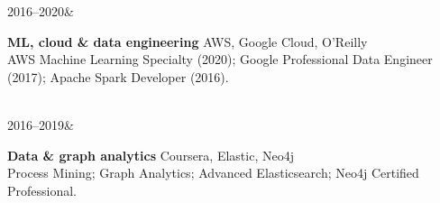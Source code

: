\documentclass[]{../../../../friggeri-cv}
\renewcommand{\entrytwo}[4]{%
  #1&\parbox[t]{14cm}{%
    \textbf{#2}%
    \hfill%
    {\small\color{textcolor} #3}\\%
    #4\vspace{\parsep}%
  }\\}
\begin{document}
\begin{entrylist2}
    \entrytwo
        {\small 2016--2020}
        {\small ML, cloud \& data engineering}
        {\small AWS, Google Cloud, O'Reilly}
        {\small AWS Machine Learning Specialty (2020); Google Professional Data Engineer (2017); Apache Spark Developer (2016).}
    \entrytwo
        {\small 2016--2019}
        {\small Data \& graph analytics}
        {\small Coursera, Elastic, Neo4j}
        {\small Process Mining; Graph Analytics; Advanced Elasticsearch; Neo4j Certified Professional.}
\end{entrylist2}
\end{document}
